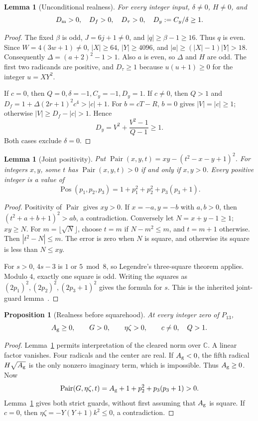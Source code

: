 \documentclass[11pt,a4paper]{article}
\newtheorem{lemma}[theorem]{Lemma}
\newtheorem{proposition}[theorem]{Proposition}
\theoremstyle{definition}\newtheorem{definition}[theorem]{Definition}
\theoremstyle{remark}\newtheorem{remark}[theorem]{Remark}
\newcommand{\pos}{\operatorname{Pos}}\newcommand{\Pair}{\operatorname{Pair}}
\newcommand{\Dm}{D_{\rm m}}\newcommand{\Dt}{D_{\tau}}
\newcommand{\Df}{D_f}\newcommand{\Dy}{D_y}\newcommand{\Ag}{A_{\rm g}}
\numberwithin{equation}{section}
\begin{document}
\begin{lemma}[Unconditional realness]\label{lem:realness}
For every integer input, \(\delta\ne0\), \(H\ne0\), and
\[
\Dm>0,\quad\Df>0,\quad\Dt>0,\quad \Dy:=C_y/\delta\ge1.
\]
\end{lemma}
\begin{proof}
The fixed \(\beta\) is odd, \(J=6j+1\ne0\), and
\(|q|\ge\beta-1\ge16\). Thus \(q\) is even.
Since \(W=4(3w+1)\ne0\),
\(|X|\ge64\), \(|Y|\ge4096\), and
\(|a|\ge(|X|-1)|Y|>18\).
Consequently \(\Delta=(a+2)^2-1>1\).
Also \(a\) is even, so \(\Delta\) and \(H\) are odd.
The first two radicands are positive, and
\(\Dt\ge1\) because \(u(u+1)\ge0\) for the integer \(u=XY^2\).

If \(c=0\), then \(Q=0,\delta=-1,C_y=-1,\Dy=1\).
If \(c\ne0\), then \(Q>1\) and
\(\Df=1+\Delta(2r+1)^2c^4>|c|+1\).
For \(b=cT-R\), \(b=0\) gives \(|V|=|c|\ge1\);
otherwise \(|V|\ge\Df-|c|>1\).
Hence
\[
\Dy=V^2+\frac{V^2-1}{Q-1}\ge1.
\]
Both cases exclude \(\delta=0\).
\end{proof}

\begin{lemma}[Joint positivity]\label{lem:pair}
Put \(\Pair(x,y,t)=xy-(t^2-x-y+1)^2\).
For integers \(x,y\), some \(t\) has \(\Pair(x,y,t)>0\)
if and only if \(x,y>0\).
Every positive integer is a value of
\[
\pos(p_1,p_2,p_3)=1+p_1^2+p_2^2+p_3(p_3+1).
\]
\end{lemma}
\begin{proof}
Positivity of \(\Pair\) gives \(xy>0\).
If \(x=-a,y=-b\) with \(a,b>0\), then
\((t^2+a+b+1)^2>ab\), a contradiction.
Conversely let \(N=x+y-1\ge1\); \(xy\ge N\).
For \(m=\lfloor\sqrt N\rfloor\), choose \(t=m\) if \(N-m^2\le m\),
and \(t=m+1\) otherwise. Then \(|t^2-N|\le m\).
The error is zero when \(N\) is square, and otherwise its square
is less than \(N\le xy\).

For \(s>0\), \(4s-3\) is \(1\) or \(5\bmod8\), so Legendre's
three-square theorem applies. Modulo \(4\), exactly one square is
odd. Writing the squares as
\((2p_1)^2,(2p_2)^2,(2p_3+1)^2\) gives the formula for \(s\).
This is the inherited joint-guard lemma~\cite{joint}.
\end{proof}

\begin{proposition}[Realness before squarehood]\label{prop:guard}
At every integer zero of \(P_{13}\),
\[
\Ag\ge0,\qquad G>0,\qquad\eta\zeta>0,\qquad c\ne0,\quad Q>1.
\]
\end{proposition}
\begin{proof}
Lemma~\ref{lem:realness} permits interpretation of the cleared norm
over \(\mathbb C\). A linear factor vanishes. Four radicals and the
center are real. If \(\Ag<0\), the fifth radical
\(H\sqrt{\Ag}\) is the only nonzero imaginary term, which is
impossible. Thus \(\Ag\ge0\).
Now
\[
\Pair(G,\eta\zeta,t)=\Ag+1+p_2^2+p_3(p_3+1)>0.
\]
Lemma~\ref{lem:pair} gives both strict guards, without first assuming
that \(\Ag\) is square. If \(c=0\), then
\(\eta\zeta=-Y(Y+1)k^2\le0\), a contradiction.
\end{proof}
\end{document}
